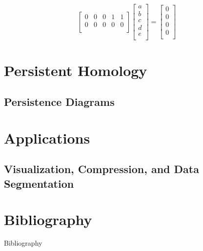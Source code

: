 \begin{frame}
\begin{overlayarea}{\linewidth}{.5\textheight}
{\begin{align*}
\begin{bmatrix}
					0 &  0 &  0 &  1 &  1 \\
					0 &  0 &  0 &  0 &  0 \\
				\end{bmatrix}
				\begin{bmatrix}
					a\\b\\c\\d\\e\\
				\end{bmatrix}
				= \begin{bmatrix}
					0\\0\\0\\0\\
				\end{bmatrix}
			\end{align*}
		}
	\end{overlayarea}
\end{frame}


\section[Persistence]{Persistent Homology}
\subsection{Persistence Diagrams}
\begin{frame}
	\href{https://www.youtube.com/embed/h0bnG1Wavag?start=285&end=302&mute=1}{}
\end{frame}

\section{Applications}
\subsection{Visualization, Compression, and Data Segmentation}
\begin{frame}
\end{frame}

\section*{Bibliography}
\begin{frame}{Bibliography}
	\nocite{wagner}
	\nocite{hatcher}
	\nocite{fraleigha}
	\begingroup
	\renewcommand{\section}[2]{}%
	
	\endgroup
\end{frame}






